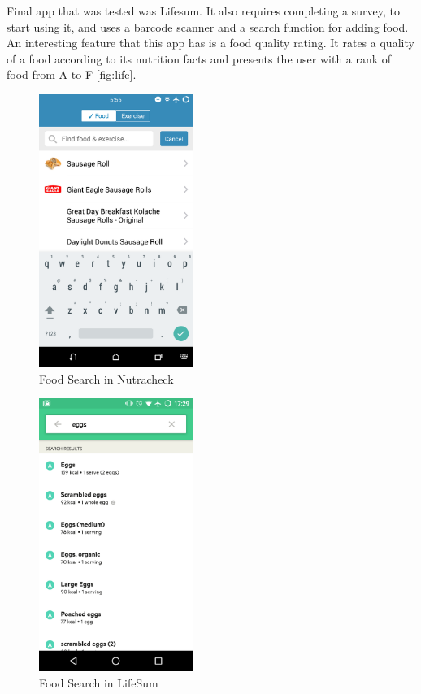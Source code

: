 Final app that was tested was Lifesum. It also requires completing a survey, to start using it, and uses a barcode scanner and a search function for adding food. An interesting feature that this app has is a food quality rating. It rates a quality of a food according to its nutrition facts and presents the user with a rank of food from A to F \autoref{fig:life}.

 \begin{figure}[ht]
\centering
\includegraphics[width=5cm]{Figures/2/eat.png}
\caption{Food  Search in Nutracheck}
\label{fig:eat}
\end{figure}

\begin{figure}[ht]
\centering
\includegraphics[width=5cm]{Figures/2/mm.png}
\caption{Food  Search in LifeSum}
\label{fig:life}
\end{figure}

